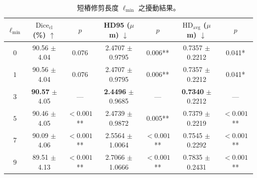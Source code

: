 \begin{table}[htbp]
  \centering
  \caption{短樁修剪長度 $\ell_{\min}$ 之擾動結果。}
  \label{tab:param-stub}
  \small
  \setlength{\tabcolsep}{4pt}
  \begin{tabular}{ccccccc}
    \toprule
    $\ell_{\min}$ & $\text{Dice}_{\text{cl}}$ (\%) $\uparrow$ & $p$ & HD95 ($\mu$m) $\downarrow$ & $p$ & $\text{HD}_{\text{avg}}$ ($\mu$m) $\downarrow$ & $p$ \\
    \midrule
    $0$ & 90.56 $\pm$ 4.04 & 0.076 & 2.4707 $\pm$ 0.9795 & 0.006** & 0.7357 $\pm$ 0.2212 & 0.041* \\
    $1$ & 90.56 $\pm$ 4.04 & 0.076 & 2.4707 $\pm$ 0.9795 & 0.006** & 0.7357 $\pm$ 0.2212 & 0.041* \\
    \textbf{$3$} & \textbf{90.57} $\pm$ 4.05 & --- & \textbf{2.4496} $\pm$ 0.9685 & --- & \textbf{0.7340} $\pm$ 0.2212 & --- \\
    $5$ & 90.46 $\pm$ 4.05 & $<\!0.001$** & 2.4739 $\pm$ 0.9872 & 0.005** & 0.7379 $\pm$ 0.2219 & $<\!0.001$** \\
    $7$ & 90.09 $\pm$ 4.06 & $<\!0.001$** & 2.5564 $\pm$ 1.0064 & $<\!0.001$** & 0.7545 $\pm$ 0.2292 & $<\!0.001$** \\
    $9$ & 89.51 $\pm$ 4.13 & $<\!0.001$** & 2.7066 $\pm$ 1.0666 & $<\!0.001$** & 0.7835 $\pm$ 0.2431 & $<\!0.001$** \\
    \bottomrule
  \end{tabular}
\end{table}

